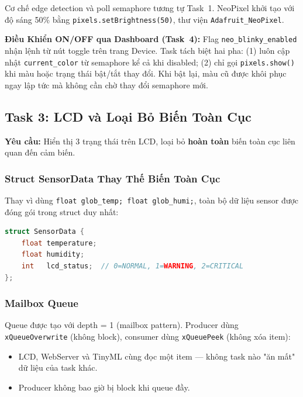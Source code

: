 \documentclass[12pt,a4paper]{article}
\begin{document}
Cơ chế edge detection và poll semaphore tương tự Task~1. NeoPixel khởi tạo với độ sáng 50\% bằng \texttt{pixels.setBrightness(50)}, thư viện \texttt{Adafruit\_NeoPixel}.

\textbf{Điều Khiển ON/OFF qua Dashboard (Task~4):} Flag \texttt{neo\_blinky\_enabled} nhận lệnh từ nút toggle trên trang Device. Task tách biệt hai pha: (1) luôn cập nhật \texttt{current\_color} từ semaphore kể cả khi disabled; (2) chỉ gọi \texttt{pixels.show()} khi màu hoặc trạng thái bật/tắt thay đổi. Khi bật lại, màu cũ được khôi phục ngay lập tức mà không cần chờ thay đổi semaphore mới.

\subsection{Task 3: LCD và Loại Bỏ Biến Toàn Cục}

\textbf{Yêu cầu:} Hiển thị 3 trạng thái trên LCD, loại bỏ \textbf{hoàn toàn} biến toàn cục liên quan đến cảm biến.

\subsubsection{Struct SensorData Thay Thế Biến Toàn Cục}

Thay vì dùng \texttt{float glob\_temp; float glob\_humi;}, toàn bộ dữ liệu sensor được đóng gói trong struct duy nhất:

\begin{lstlisting}[language=C++, caption=Struct SensorData trong include/global.h]
struct SensorData {
    float temperature;
    float humidity;
    int   lcd_status;  // 0=NORMAL, 1=WARNING, 2=CRITICAL
};
\end{lstlisting}

\subsubsection{Mailbox Queue}

Queue được tạo với depth = 1 (mailbox pattern). Producer dùng \texttt{xQueueOverwrite} (không block), consumer dùng \texttt{xQueuePeek} (không xóa item):

\begin{itemize}
    \item LCD, WebServer và TinyML cùng đọc một item — không task nào "ăn mất" dữ liệu của task khác.
    \item Producer không bao giờ bị block khi queue đầy.
\end{itemize}
\end{document}
